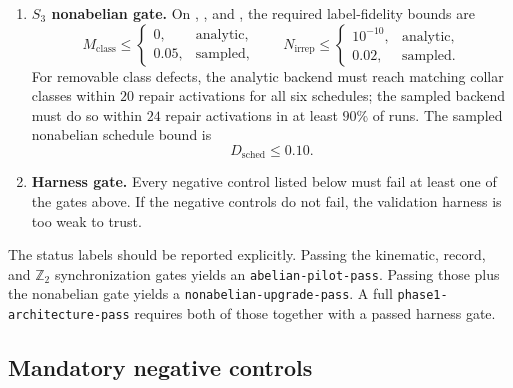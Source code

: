 \documentclass[11pt]{article}
\begin{document}
\begin{enumerate}[leftmargin=2em]
and the residual label must remain unchanged for the final $10$ cycles. A run that oscillates
indefinitely, or that reports $\Phi=0$ while the forced stale source is still present, fails
this gate.
\item \textbf{$S_3$ nonabelian gate.}
On , , and
, the required label-fidelity bounds are
\begin{equation}
M_{\mathrm{class}}\le
\begin{cases}
0, & \text{analytic},\\
0.05, & \text{sampled},
\end{cases}
\qquad
N_{\mathrm{irrep}}\le
\begin{cases}
10^{-10}, & \text{analytic},\\
0.02, & \text{sampled}.
\end{cases}
\end{equation}
For removable class defects, the analytic backend must reach matching collar classes within $20$
repair activations for all six schedules; the sampled backend must do so within $24$ repair
activations in at least $90\%$ of runs. The sampled nonabelian schedule bound is
\begin{equation}
D_{\mathrm{sched}}\le 0.10.
\end{equation}
\item \textbf{Harness gate.}
Every negative control listed below must fail at least one of the gates above. If the negative
controls do not fail, the validation harness is too weak to trust.
\end{enumerate}

The status labels should be reported explicitly. Passing the kinematic, record, and
$\mathbb Z_2$ synchronization gates yields an \texttt{abelian-pilot-pass}. Passing those plus
the nonabelian gate yields a \texttt{nonabelian-upgrade-pass}. A full
\texttt{phase1-architecture-pass} requires both of those together with a passed harness gate.

\subsection{Mandatory negative controls}
\end{document}
